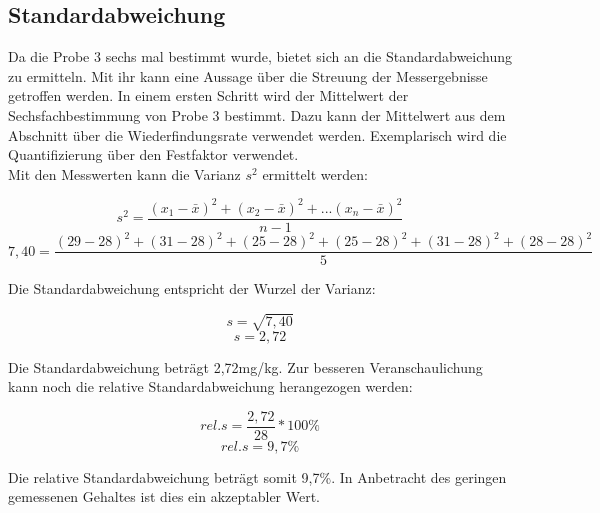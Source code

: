 \subsection{Standardabweichung}
Da die Probe 3 sechs mal bestimmt wurde, bietet sich an die Standardabweichung zu ermitteln. Mit ihr kann eine Aussage über die Streuung der Messergebnisse getroffen werden. In einem ersten Schritt wird der Mittelwert der Sechsfachbestimmung von Probe 3 bestimmt. Dazu kann der Mittelwert aus dem Abschnitt über die Wiederfindungsrate verwendet werden. Exemplarisch wird die Quantifizierung über den Festfaktor verwendet.\\
Mit den Messwerten kann die Varianz $s^{ 2 }$ ermittelt werden:

    \[s^{ 2 }=\frac{ (x_{ 1 }-\bar{x})^{ 2 }+(x_{ 2 }-\bar{x})^{ 2 }+...(x_{ n }-\bar{x})^{ 2 } }{ n-1 }\]
    \[7,40=\frac{ (29-28)^{ 2 }+(31-28)^{ 2 }+(25-28)^{ 2 }+(25-28)^{ 2 }+(31-28)^{ 2 }+(28-28)^{ 2 } }{ 5 }\]

Die Standardabweichung entspricht der Wurzel der Varianz:

    \[s=\sqrt{ 7,40 }\]
    \[s=2,72\]

Die Standardabweichung beträgt 2,72mg/kg. Zur besseren Veranschaulichung kann noch die relative Standardabweichung herangezogen werden:

    \[rel.s=\frac{ 2,72 }{ 28 }*100\%\]
    \[rel.s=9,7\%\]

Die relative Standardabweichung beträgt somit 9,7\%. In Anbetracht des geringen gemessenen Gehaltes ist dies ein akzeptabler Wert.

